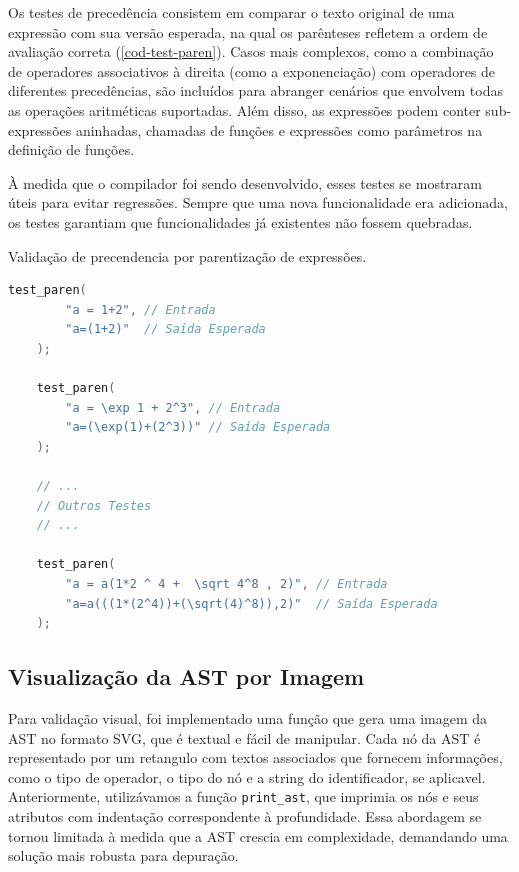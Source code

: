 Os testes de precedência consistem em comparar o texto original de uma expressão com sua versão esperada, na qual os parênteses refletem a ordem de avaliação correta (\autoref{cod-test-paren}). Casos mais complexos, como a combinação de operadores associativos à direita (como a exponenciação) com operadores de diferentes precedências, são incluídos para abranger cenários que envolvem todas as operações aritméticas suportadas. Além disso, as expressões podem conter sub-expressões aninhadas, chamadas de funções e expressões como parâmetros na definição de funções.

À medida que o compilador foi sendo desenvolvido, esses testes se mostraram úteis para evitar regressões. Sempre que uma nova funcionalidade era adicionada, os testes garantiam que funcionalidades já existentes não fossem quebradas.




\begin{codigo}[htb]
    \caption{\small Validação de precendencia por parentização de expressões. }
        \label{cod-test-paren}
  \begin{lstlisting}[language = C]
    test_paren(
        "a = 1+2", // Entrada
        "a=(1+2)"  // Saída Esperada
    );

    test_paren(
        "a = \exp 1 + 2^3", // Entrada
        "a=(\exp(1)+(2^3))" // Saída Esperada
    );

    // ...
    // Outros Testes
    // ...

    test_paren(
        "a = a(1*2 ^ 4 +  \sqrt 4^8 , 2)", // Entrada
        "a=a(((1*(2^4))+(\sqrt(4)^8)),2)"  // Saída Esperada
    );
  \end{lstlisting}
\end{codigo}



\subsection{Visualização da AST por Imagem}

Para validação visual, foi implementado uma função que gera uma imagem da AST no formato SVG, que é textual e fácil de manipular. Cada nó da AST é representado por um retangulo com textos associados que fornecem informações, como o tipo de operador, o tipo do nó e a string do identificador, se aplicavel. Anteriormente, utilizávamos a função \texttt{print\_ast}, que imprimia os nós e seus atributos com indentação correspondente à profundidade. Essa abordagem se tornou limitada à medida que a AST crescia em complexidade, demandando uma solução mais robusta para depuração.

